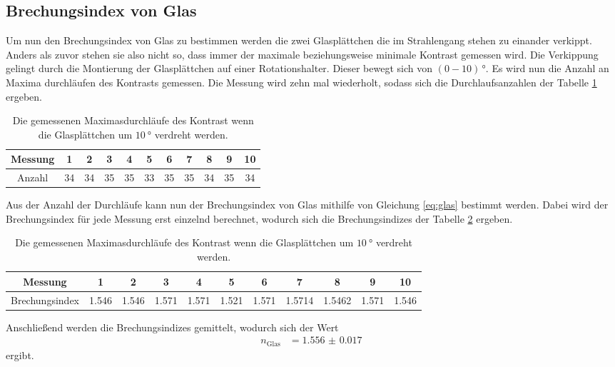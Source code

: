 \subsection{Brechungsindex von Glas}
Um nun den Brechungsindex von Glas zu bestimmen werden die zwei Glasplättchen die im Strahlengang stehen zu einander verkippt.
Anders als zuvor stehen sie also nicht so, dass immer der maximale beziehungsweise minimale Kontrast gemessen wird.
Die Verkippung gelingt durch die Montierung der Glasplättchen auf einer Rotationshalter.
Dieser bewegt sich von $(0-10)\,\si{\degree}$.
Es wird nun die Anzahl an Maxima durchläufen des Kontrasts gemessen.
Die Messung wird zehn mal wiederholt, sodass sich die Durchlaufsanzahlen der Tabelle \ref{tab:counts_glas} ergeben.
\begin{table}
    \centering
    \begin{tabular}{ccccccccccc}
        \toprule 
        Messung & 1&2&3&4&5&6&7&8&9&10\\
        \midrule
        Anzahl &34 & 34& 35& 35& 33& 35& 35& 34& 35& 34\\
        \bottomrule
    \end{tabular}
    \caption{Die gemessenen Maximasdurchläufe des Kontrast wenn die Glasplättchen um $\SI{10}{\degree}$ verdreht werden.}
    \label{tab:counts_glas}
\end{table}
Aus der Anzahl der Durchläufe kann nun der Brechungsindex von Glas mithilfe von Gleichung \eqref{eq:glas} bestimmt werden.
Dabei wird der Brechungsindex für jede Messung erst einzelnd berechnet, wodurch sich die Brechungsindizes der Tabelle \ref{tab:n_glas} ergeben.
\begin{table}
    \hspace*{-1cm}
    \begin{tabular}{ccccccccccc}
        \toprule 
        Messung & 1&2&3&4&5&6&7&8&9&10\\
        \midrule
        Brechungsindex &1.546&1.546&1.571&1.571&1.521&1.571& 1.5714&1.5462&1.571& 1.546\\
        \bottomrule
    \end{tabular}
    \caption{Die gemessenen Maximasdurchläufe des Kontrast wenn die Glasplättchen um $\SI{10}{\degree}$ verdreht werden.}
    \label{tab:n_glas}
\end{table}
Anschließend werden die Brechungsindizes gemittelt, wodurch sich der Wert 
\begin{align}
    n_\text{Glas} &= \SI{1.556(17)}{}
\end{align}
ergibt.
